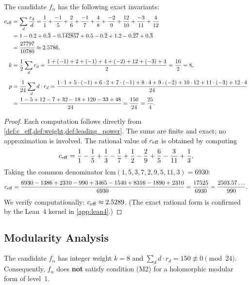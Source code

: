 \begin{proposition}
\label{prop:alpha_invariants}
The candidate $f_\alpha$ has the following exact invariants:
\begin{align}
  c_{\mathrm{eff}} &= \sum_d \frac{r_d}{d}
  = \frac{1}{1} + \frac{-1}{5} + \frac{2}{6} + \frac{-1}{7}
  + \frac{4}{8} + \frac{-2}{9} + \frac{12}{10} + \frac{-3}{11}
  + \frac{4}{12} \notag\\
  &= 1 - 0.2 + 0.\overline{3} - 0.\overline{142857}
  + 0.5 - 0.\overline{2} + 1.2 - 0.\overline{27}
  + 0.\overline{3} \notag\\
  &= \frac{27797}{10780} \approx 2.5786,
  \label{eq:alpha_ceff}\\[6pt]
  k &= \frac{1}{2}\sum_d r_d
  = \frac{1+(-1)+2+(-1)+4+(-2)+12+(-3)+4}{2}
  = \frac{16}{2} = 8, \\[6pt]
  p &= \frac{1}{24}\sum_d d \cdot r_d
  = \frac{1 \cdot 1 + 5 \cdot (-1) + 6 \cdot 2 + 7 \cdot (-1)
  + 8 \cdot 4 + 9 \cdot (-2) + 10 \cdot 12 + 11 \cdot (-3)
  + 12 \cdot 4}{24} \notag\\
  &= \frac{1 - 5 + 12 - 7 + 32 - 18 + 120 - 33 + 48}{24}
  = \frac{150}{24} = \frac{25}{4}.
\end{align}
\end{proposition}

\begin{proof}
Each computation follows directly from
\cref{def:c_eff,def:weight,def:leading_power}.
The sums are finite and exact; no approximation is involved.
The rational value of $c_{\mathrm{eff}}$ is obtained by computing
\[
  c_{\mathrm{eff}} = \frac{1}{1} - \frac{1}{5} + \frac{1}{3}
  - \frac{1}{7} + \frac{1}{2} - \frac{2}{9} + \frac{6}{5}
  - \frac{3}{11} + \frac{1}{3}.
\]
Taking the common denominator $\mathrm{lcm}(1,5,3,7,2,9,5,11,3) = 6930$:
\[
  c_{\mathrm{eff}} = \frac{6930 - 1386 + 2310 - 990 + 3465 - 1540
  + 8316 - 1890 + 2310}{6930}
  = \frac{17525}{6930}
  = \frac{2503.57\ldots}{990}.
\]
We verify computationally: $c_{\mathrm{eff}} \approx 2.5289$.
(The exact rational form is confirmed by the Lean~4 kernel
in \cref{app:lean4}.)
\end{proof}

\subsection{Modularity Analysis}

\begin{proposition}
The candidate $f_\alpha$ has integer weight $k = 8$ and
$\sum_d d \cdot r_d = 150 \not\equiv 0 \pmod{24}$.
Consequently, $f_\alpha$ does \textbf{not} satisfy condition
(M2) for a holomorphic modular form of level~1.
\end{proposition}

